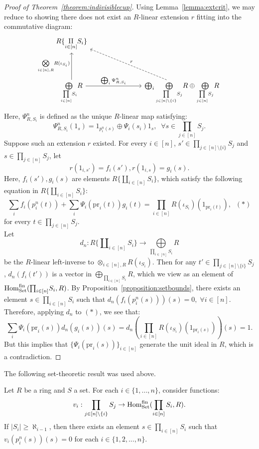 \begin{proof}[Proof of Theorem~\ref{theorem:indivisiblecup}]
Using Lemma~\ref{lemma:extcrit}, we may reduce to showing there does not exist an $R$-linear extension $r$ fitting into the 
commutative diagram:
\[\begin{tikzcd}R\{\underset{i \in [n]}{\amalg} S_i\} &[5em]\\[5ex] \underset{{\underset{i \in [n]}{\prod} S_i}}{\bigoplus} R \arrow[r, "\bigoplus_i \Psi_{R,S_i}^n"] \arrow[u,"\underset{i \in [n],R}{\bigotimes} R(\iota_{S_i})"]& \bigoplus_{i} \underset{\underset{j \in [n] \setminus \{i\}}{\prod} S_j}{\bigoplus} R \oplus \underset{\underset{j \in [n]}{\prod}S_j}{\bigoplus}  R \arrow[ul, dashed, swap, "r"]\end{tikzcd}\]
Here, $\Psi^n_{R, S_i}$ is defined as the unique $R$-linear map satisfying:
\[\Psi^n_{R, S_i}(1_s) = 1_{p^n_i(s)} \oplus \Psi_i(s_i) 1_{s}, \; \; \forall s \in \prod_{j \in [n]} S_j.\]
Suppose such an extension $r$ existed. For every $ i \in [n]$, $s' \in \prod_{j \in [n]\setminus \{i\}} S_j$ and 
$s \in \prod_{j \in [n]}S_j$, let
\[r(1_{i,s'}) = f_i(s'), r(1_{i,s}) = g_i(s).\]
Here, $f_i(s'), g_i(s)$ are elements $R\{\amalg_{i \in [n]} S_i\}$, which satisfy the following equation in 
$R\{\amalg_{i \in [n]} S_i\}$: 
\[\sum_i f_i(p^n_i(t)) + \sum_i \Psi_{i}(\text{pr}_i(t)) g_i(t) = \prod_{i \in [n]} R(\iota_{S_i})(1_{\text{pr}_i(t)}), \; \; (*)\]
for every $t \in \prod_{j \in [n]} S_j$.\\
\indent Let 
\[d_n: R\{\amalg_{i \in [n]} S_i\} \to \underset{\underset{i \in [n]}{\prod}S_i}{\bigoplus}  R\]
be the $R$-linear left-inverse to ${\otimes}_{i \in [n],R} R(\iota_{S_i})$. Then for any $t' \in  \prod_{j \in [n]\setminus \{i\}} S_j$, $d_n(f_i(t'))$ 
is a vector in $\bigoplus_{\underset{i \in [n]}{\prod}S_i}  R$, which we view as an element of $\operatorname{Hom}^{\mathrm{fin}}_{\mathrm{Set}}({\prod}_{i \in [n]}S_i , R)$. 
By Proposition~\ref{proposition:setbounds}, there exists an element $s \in \prod_{i \in [n]} S_i$ such that $d_n(f_i(p^n_i(s)))(s)=0, \; \forall i \in [n]$. 
Therefore, applying $d_n$ to $(*)$, we see that:
\[\sum_i \Psi_i(\text{pr}_i(s)) d_n(g_i(s))(s) = d_n(\prod_{i \in [n]} R(\iota_{S_i})(1_{\text{pr}_i(s)}))(s) = 1.\]
But this implies that $\{\Psi_i(\text{pr}_i(s))\}_{i \in [n]}$ generate the unit ideal in $R$, which is a contradiction.
\end{proof}
The following set-theoretic result was used above.
\begin{proposition}\label{proposition:setbounds}
Let $R$ be a ring and $S$ a set. For each $ i\in \{1,...,n\}$, consider functions:
\[v_i: \prod_{j \in [n] \setminus \{i\}} S_j \rightarrow \operatorname{Hom}^{\mathrm{fin}}_{\mathrm{Set}}(\prod_{i \in [n]} S_i,R).\]
If $|S_i| \ge \aleph_{i-1}$, then there exists an element $s \in \prod_{i \in [n]} S_i$ such that $v_i(p^n_i(s))(s) = 0$ 
for each $i \in \{1,2,...,n\}$.
\end{proposition}
